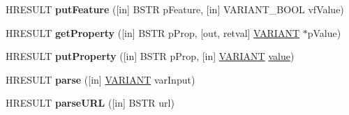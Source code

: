 \begin{DoxyCompactItemize}
\item 
\mbox{\label{interface_m_s_x_m_l2_1_1_i_v_b_s_a_x_x_m_l_reader_abec321258f6a964c409c03ee69144b86}} 
H\+R\+E\+S\+U\+LT {\bfseries put\+Feature} (\mbox{[}in\mbox{]} B\+S\+TR p\+Feature, \mbox{[}in\mbox{]} V\+A\+R\+I\+A\+N\+T\+\_\+\+B\+O\+OL vf\+Value)
\item 
\mbox{\label{interface_m_s_x_m_l2_1_1_i_v_b_s_a_x_x_m_l_reader_aa3fc960b6d308516e2e0d693fe264a35}} 
H\+R\+E\+S\+U\+LT {\bfseries get\+Property} (\mbox{[}in\mbox{]} B\+S\+TR p\+Prop, \mbox{[}out, retval\mbox{]} \hyperlink{structtag_v_a_r_i_a_n_t}{V\+A\+R\+I\+A\+NT} $\ast$p\+Value)
\item 
\mbox{\label{interface_m_s_x_m_l2_1_1_i_v_b_s_a_x_x_m_l_reader_a71fb6b5aa7f1f8b918011f606c98312e}} 
H\+R\+E\+S\+U\+LT {\bfseries put\+Property} (\mbox{[}in\mbox{]} B\+S\+TR p\+Prop, \mbox{[}in\mbox{]} \hyperlink{structtag_v_a_r_i_a_n_t}{V\+A\+R\+I\+A\+NT} \hyperlink{unionvalue}{value})
\item 
\mbox{\label{interface_m_s_x_m_l2_1_1_i_v_b_s_a_x_x_m_l_reader_a34ea86ba6ed75fb16b5783054c5309fe}} 
H\+R\+E\+S\+U\+LT {\bfseries parse} (\mbox{[}in\mbox{]} \hyperlink{structtag_v_a_r_i_a_n_t}{V\+A\+R\+I\+A\+NT} var\+Input)
\item 
\mbox{\label{interface_m_s_x_m_l2_1_1_i_v_b_s_a_x_x_m_l_reader_a24d452e71f3fd71b33f8618506af9989}} 
H\+R\+E\+S\+U\+LT {\bfseries parse\+U\+RL} (\mbox{[}in\mbox{]} B\+S\+TR url)
\end{DoxyCompactItemize}
